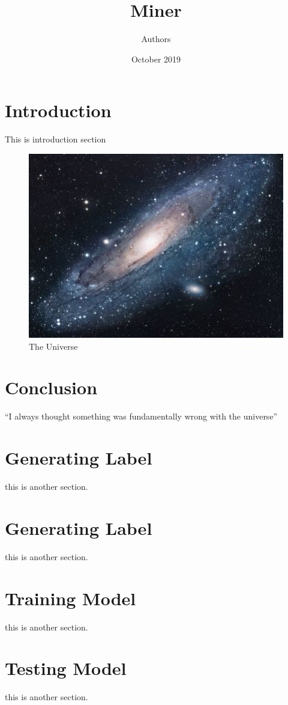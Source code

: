 \documentclass{article}
\title{Miner}
\author{Authors}
\date{October 2019}
\begin{document}
\maketitle

\section{Introduction}
This is introduction section

\begin{figure}[h!]
\centering
\includegraphics[scale=1.7]{universe}
\caption{The Universe}
\label{fig:universe}
\end{figure}

\section{Conclusion}
``I always thought something was fundamentally wrong with the universe'' \citep{adams1995hitchhiker}

\section{Generating Label}
this is another section.

\section{Generating Label}
this is another section.


\section{Training Model}
this is another section.

\section{Testing Model}
this is another section.




\end{document}
